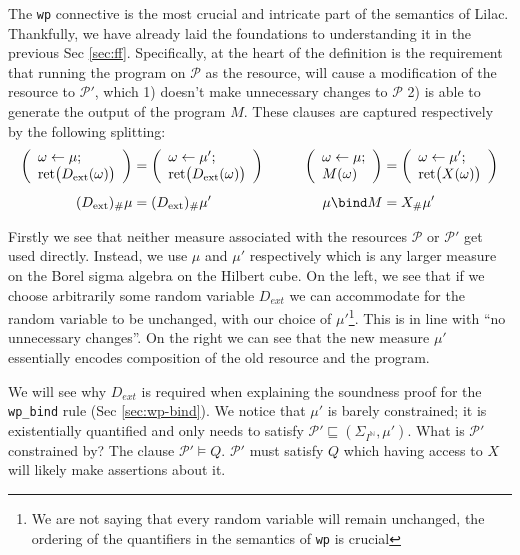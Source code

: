 The \texttt{wp} connective is the most crucial and intricate part of the semantics of Lilac. Thankfully, we have already laid the foundations to understanding it in the previous Sec \ref{sec:ff}.
Specifically, at the heart of the definition is the requirement that running the program on $\mathcal{P}$ as the resource, will cause a modification of the resource to $\mathcal{P'}$, which
1) doesn't make unnecessary changes to $\mathcal{P}$ 2) is able to generate the output of the program $M$.
These clauses are captured respectively by the following splitting:
\begin{align}
\left(
\begin{array}{l}
\omega \leftarrow \mu;\\
\mathrm{ret}\bigl(D_{\mathrm{ext}}(\omega)\bigr)
\end{array}
\right)
&=
\left(
\begin{array}{l}
\omega \leftarrow \mu';\\
\mathrm{ret}\bigl(D_{\mathrm{ext}}(\omega)\bigr)
\end{array}
\right)
\qquad&
\left(
\begin{array}{l}
\omega \leftarrow \mu;\\
M(\omega)
\end{array}
\right)
&=
\left(
\begin{array}{l}
\omega \leftarrow \mu';\\
\mathrm{ret}\bigl(X(\omega)\bigr)
\end{array}
\right)
\label{eq:original}
\\[1ex]
(D_{\mathrm{ext}})_\#\mu
&=
(D_{\mathrm{ext}})_\#\mu'
\qquad&
\mu \bind M
&=
X_\#\mu'
\label{eq:simplified}
\end{align}


Firstly we see that neither measure associated with the resources $\mathcal{P}$ or $\mathcal{P'}$ get used directly. Instead, we use $\mu$ and $\mu'$ respectively which is any larger measure
on the Borel sigma algebra on the Hilbert cube. On the left, we see that if we choose arbitrarily some random variable $D_{ext}$ we can accommodate for the random variable to be unchanged,
with our choice of $\mu'$\footnote{We are not saying that every random variable will remain unchanged, the ordering of the quantifiers in the semantics of \texttt{wp} is crucial}.
This is in line with ``no unnecessary changes''. On the right we can see that the new measure $\mu'$ essentially encodes composition of the old resource and the program.

We will see why $D_{ext}$ is required when explaining the soundness proof for the \texttt{wp\_bind} rule (Sec \ref{sec:wp-bind}). We notice that $\mu'$ is barely constrained; it is existentially quantified and only needs
to satisfy $\mathcal{P'} \sqsubseteq (\Sigma_{I^\mathbb{N}},\mu')$. What is $\mathcal{P'}$ constrained by? The clause $\mathcal{P'} \vDash Q$. $\mathcal{P'}$ must satisfy $Q$ which having
access to $X$ will likely make assertions about it.

